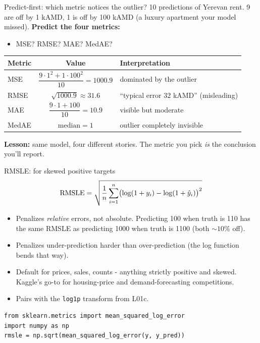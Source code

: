 \documentclass[aspectratio=169]{beamer}
\begin{document}
\begin{frame}{Predict-first: which metric notices the outlier?}
  10 predictions of Yerevan rent. 9 are off by 1 kAMD, 1 is off by 100 kAMD (a luxury apartment your model missed).
  \vfill
  \pause
  \textbf{Predict the four metrics:}
  \begin{itemize}
    \item MSE? \quad RMSE? \quad MAE? \quad MedAE?
  \end{itemize}
  \pause
  \vfill
  \begin{center}\small
    \begin{tabular}{lcl}
      Metric & Value & Interpretation \\ \hline
      MSE   & $\dfrac{9 \cdot 1^2 + 1 \cdot 100^2}{10} = 1000.9$ & dominated by the outlier \\[4pt]
      RMSE  & $\sqrt{1000.9} \approx 31.6$ & ``typical error 32 kAMD'' (misleading) \\[2pt]
      MAE   & $\dfrac{9 \cdot 1 + 100}{10} = 10.9$ & visible but moderate \\[4pt]
      MedAE & $\text{median} = 1$ & outlier completely invisible \\
    \end{tabular}
  \end{center}
  \vfill
  \footnotesize \textbf{Lesson:} same model, four different stories. The metric you pick \emph{is} the conclusion you'll report.
\end{frame}

\begin{frame}[fragile]{RMSLE: for skewed positive targets}
  \[
    \text{RMSLE} = \sqrt{\frac{1}{n} \sum_{i=1}^n \bigl( \log(1+y_i) - \log(1+\hat{y}_i) \bigr)^2 }
  \]
  \vfill
  \begin{itemize}
    \item Penalizes \emph{relative} errors, not absolute. Predicting 100 when truth is 110 has the same RMSLE as predicting 1000 when truth is 1100 (both $\sim 10\%$ off).
    \item Penalizes under-prediction harder than over-prediction (the log function bends that way).
    \item Default for prices, sales, counts - anything strictly positive and skewed. Kaggle's go-to for housing-price and demand-forecasting competitions.
    \item Pairs with the \texttt{log1p} transform from L01c.
  \end{itemize}
  \vfill
{\lstset{basicstyle=\ttfamily\scriptsize}
\begin{lstlisting}
from sklearn.metrics import mean_squared_log_error
import numpy as np
rmsle = np.sqrt(mean_squared_log_error(y, y_pred))
\end{lstlisting}}
\end{frame}
\end{document}
